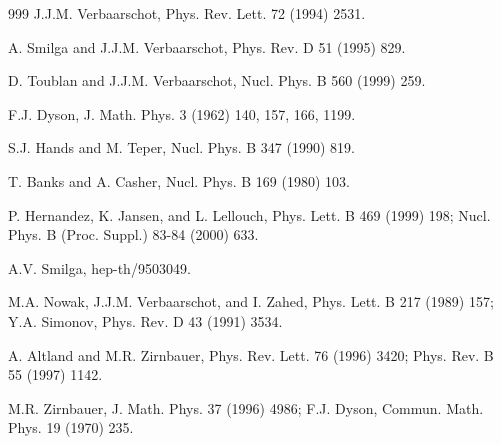 \begin{thebibliography}{999}
     J.J.M. Verbaarschot, 
                      Phys. Rev. Lett. 72 (1994) 2531.   %

         A. Smilga and J.J.M. Verbaarschot,
                      Phys. Rev. D 51 (1995) 829.        %

      D. Toublan and J.J.M. Verbaarschot, 
                      Nucl. Phys. B 560 (1999) 259.      %

      F.J. Dyson, 
                      J. Math. Phys. 3 (1962) 140, 157, 166, 1199.  %

       S.J. Hands and M. Teper, 
                      Nucl. Phys. B 347 (1990) 819.      %

      T. Banks and A. Casher, 
                      Nucl. Phys. B 169 (1980) 103.      %

 P. Hernandez, K. Jansen, and L. Lellouch,
                      Phys. Lett. B 469 (1999) 198;      %
                      Nucl. Phys. B (Proc. Suppl.) 83-84 (2000) 633.

     A.V. Smilga,
                      hep-th/9503049.                    %

       M.A. Nowak, J.J.M. Verbaarschot, and I. Zahed,
                      Phys. Lett. B 217 (1989) 157;      %
                      Y.A. Simonov, 
                      Phys. Rev. D 43 (1991) 3534.       %

     A. Altland and M.R. Zirnbauer, 
                      Phys. Rev. Lett. 76 (1996) 3420;   %
                      Phys. Rev. B 55 (1997) 1142.

       M.R. Zirnbauer, 
                      J. Math. Phys. 37 (1996) 4986;     %
                      F.J. Dyson, 
                      Commun. Math. Phys. 19 (1970) 235.   %


\end{thebibliography}
